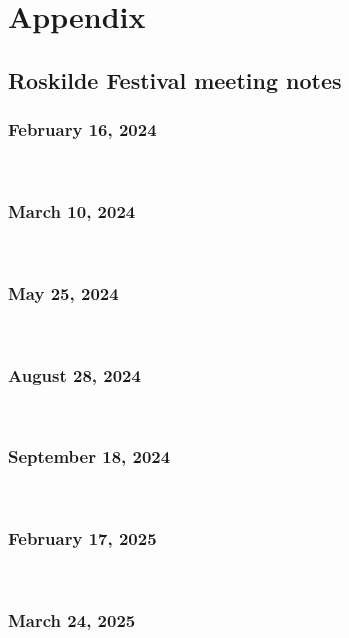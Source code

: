 \chapter{Appendix}

\section{Roskilde Festival meeting notes}
\label{appendix:rf-meeting-notes}

\subsection{February 16, 2024}
\label{appendix:rf-feb-24}
\


\subsection{March 10, 2024}
\label{appendix:rf-mar-24}
\


\subsection{May 25, 2024}
\label{appendix:rf-may-24}
\


\subsection{August 28, 2024}
\label{appendix:rf-aug-24}
\


\subsection{September 18, 2024}
\label{appendix:rf-sep-24}
\


\subsection{February 17, 2025}
\label{appendix:rf-feb-25}
\


\subsection{March 24, 2025}
\label{appendix:rf-mar-25}
\


